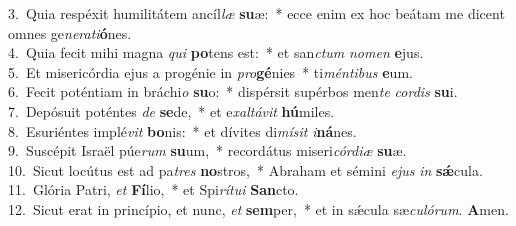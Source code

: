 {3.~}Quia respéxit humilitátem ancíl\textit{læ} \textbf{su}æ:~* ecce enim ex hoc beátam me dicent omnes ge\textit{ne}\textit{ra}\textit{ti}\textbf{ó}nes.\\
{4.~}Quia fecit mihi magna \textit{qui} \textbf{po}tens est:~* et san\textit{ctum} \textit{no}\textit{men} \textbf{e}jus.\\
{5.~}Et misericórdia ejus a progénie in \textit{pro}\textbf{gé}nies~* ti\textit{mén}\textit{ti}\textit{bus} \textbf{e}um.\\
{6.~}Fecit poténtiam in bráchi\textit{o} \textbf{su}o:~* dispérsit supérbos men\textit{te} \textit{cor}\textit{dis} \textbf{su}i.\\
{7.~}Depósuit poténtes \textit{de} \textbf{se}de,~* et e\textit{xal}\textit{tá}\textit{vit} \textbf{hú}miles.\\
{8.~}Esuriéntes implé\textit{vit} \textbf{bo}nis:~* et dívites di\textit{mí}\textit{sit} \textit{i}\textbf{ná}nes.\\
{9.~}Suscépit Israël púe\textit{rum} \textbf{su}um,~* recordátus miseri\textit{cór}\textit{di}\textit{æ} \textbf{su}æ.\\
{10.~}Sicut locútus est ad pa\textit{tres} \textbf{no}stros,~* Abraham et sémini \textit{e}\textit{jus} \textit{in} \textbf{sǽ}cula.\\
{11.~}Glória Patri, \textit{et} \textbf{Fí}lio,~* et Spi\textit{rí}\textit{tu}\textit{i} \textbf{San}cto.\\
{12.~}Sicut erat in princípio, et nunc, \textit{et} \textbf{sem}per,~* et in sǽcula sæ\textit{cu}\textit{ló}\textit{rum}. \textbf{A}men.\\
